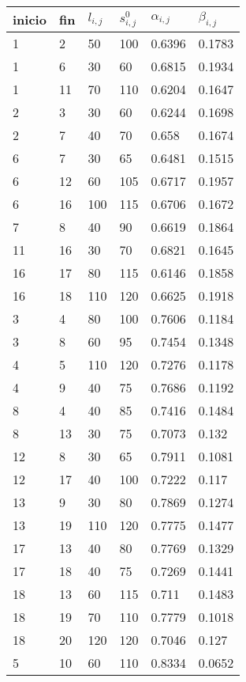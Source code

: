 \begin{table}[H]
\centering
\begin{tabular}{|l|l|l|l|l|l|}
\hline
inicio & fin & $l_{i,j}$ & $s_{i,j}^0$ & $\alpha_{i,j}$ & $\beta_{i,j}$ \\ \hline
1 & 2 & 50 & 100 & 0.6396 & 0.1783 \\ \hline
1 & 6 & 30 & 60 & 0.6815 & 0.1934 \\ \hline
1 & 11 & 70 & 110 & 0.6204 & 0.1647 \\ \hline
2 & 3 & 30 & 60 & 0.6244 & 0.1698 \\ \hline
2 & 7 & 40 & 70 & 0.658 & 0.1674 \\ \hline
6 & 7 & 30 & 65 & 0.6481 & 0.1515 \\ \hline
6 & 12 & 60 & 105 & 0.6717 & 0.1957 \\ \hline
6 & 16 & 100 & 115 & 0.6706 & 0.1672 \\ \hline
7 & 8 & 40 & 90 & 0.6619 & 0.1864 \\ \hline
11 & 16 & 30 & 70 & 0.6821 & 0.1645 \\ \hline
16 & 17 & 80 & 115 & 0.6146 & 0.1858 \\ \hline
16 & 18 & 110 & 120 & 0.6625 & 0.1918 \\ \hline
3 & 4 & 80 & 100 & 0.7606 & 0.1184 \\ \hline
3 & 8 & 60 & 95 & 0.7454 & 0.1348 \\ \hline
4 & 5 & 110 & 120 & 0.7276 & 0.1178 \\ \hline
4 & 9 & 40 & 75 & 0.7686 & 0.1192 \\ \hline
8 & 4 & 40 & 85 & 0.7416 & 0.1484 \\ \hline
8 & 13 & 30 & 75 & 0.7073 & 0.132 \\ \hline
12 & 8 & 30 & 65 & 0.7911 & 0.1081 \\ \hline
12 & 17 & 40 & 100 & 0.7222 & 0.117 \\ \hline
13 & 9 & 30 & 80 & 0.7869 & 0.1274 \\ \hline
13 & 19 & 110 & 120 & 0.7775 & 0.1477 \\ \hline
17 & 13 & 40 & 80 & 0.7769 & 0.1329 \\ \hline
17 & 18 & 40 & 75 & 0.7269 & 0.1441 \\ \hline
18 & 13 & 60 & 115 & 0.711 & 0.1483 \\ \hline
18 & 19 & 70 & 110 & 0.7779 & 0.1018 \\ \hline
18 & 20 & 120 & 120 & 0.7046 & 0.127 \\ \hline
5 & 10 & 60 & 110 & 0.8334 & 0.0652 \\ \hline

\end{tabular}
\end{table}
